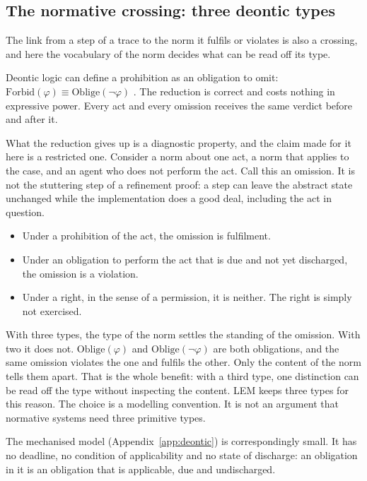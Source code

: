 \subsection{The normative crossing: three deontic types}
\label{sec:deontic}

The link from a step of a trace to the norm it fulfils or violates is also a crossing,
and here the vocabulary of the norm decides what can be read off its type.

Deontic logic can define a prohibition as an obligation to omit:
$\mathrm{Forbid}(\varphi) \equiv \mathrm{Oblige}(\neg\varphi)$ \citep{vonwright1951}. The
reduction is correct and costs nothing in expressive power. Every act and every omission
receives the same verdict before and after it.

What the reduction gives up is a diagnostic property, and the claim made for it here is
a restricted one. Consider a norm about one act, a norm that applies to the case, and an
agent who does not perform the act. Call this an omission. It is not the stuttering step
of a refinement proof: a step can leave the abstract state unchanged while the
implementation does a good deal, including the act in question.
\begin{itemize}
  \item Under a prohibition of the act, the omission is fulfilment.
  \item Under an obligation to perform the act that is due and not yet discharged, the
        omission is a violation.
  \item Under a right, in the sense of a permission, it is neither. The right is simply
        not exercised.
\end{itemize}
With three types, the type of the norm settles the standing of the omission. With two it
does not. $\mathrm{Oblige}(\varphi)$ and $\mathrm{Oblige}(\neg\varphi)$ are both
obligations, and the same omission violates the one and fulfils the other. Only the
content of the norm tells them apart. That is the whole benefit: with a third type, one
distinction can be read off the type without inspecting the content. LEM keeps three
types for this reason. The choice is a modelling convention. It is not an argument that
normative systems need three primitive types.

The mechanised model (Appendix~\ref{app:deontic}) is correspondingly small. It has no
deadline, no condition of applicability and no state of discharge: an obligation in it
is an obligation that is applicable, due and undischarged.

